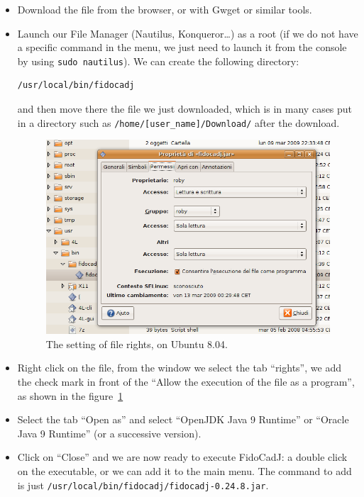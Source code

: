\documentclass[10pt,a4paper,twoside]{scrreprt}
\begin{document}
\begin{itemize}
\item {Download the file from the browser, or with Gwget or similar tools.}

\item{Launch our File Manager (Nautilus, Konqueror\dots) as a root (if we do not have a specific command in the menu, we just need to launch it from the console by using \lstinline!sudo nautilus!). We can create the following directory:
\begin{lstlisting}
/usr/local/bin/fidocadj
\end{lstlisting}
and then move there the file we just downloaded, which is in many cases put in a directory such as \lstinline!/home/[user_name]/Download/! after the download.}

\begin{figure}
\centering
\includegraphics[width=.8\textwidth]{permessi}
\caption{The setting of file rights, on Ubuntu 8.04.}
\label{fig_permessi}
\end{figure}

\item {Right click on the file, from the window we select the tab ``rights'', we add the check mark in front of the ``Allow the execution of the file as a program'', as shown in the figure~\ref{fig_permessi}}


\item {Select the tab ``Open as'' and select ``OpenJDK Java 9 Runtime'' or ``Oracle Java 9 Runtime'' (or a successive version).}%

\item {Click on ``Close'' and we are now ready to execute FidoCadJ: a double click on the executable, or we can add it to the main menu. The command to add is just \lstinline!/usr/local/bin/fidocadj/fidocadj-0.24.8.jar!.}
\end{itemize}
\end{document}
